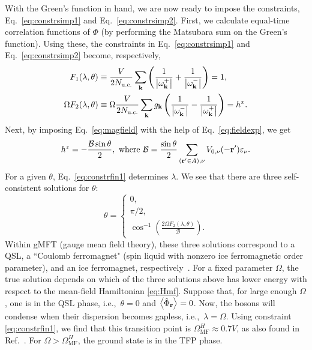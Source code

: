 \documentclass[twocolumn,superscriptaddress,amsmath,amssymb,aps,prx,nofootinbib]{revtex4-2}
\begin{document}
With the Green's function in hand, we are now ready to impose the constraints,  Eq.~\eqref{eq:constrsimp1} and Eq.~\eqref{eq:constrsimp2}. First, we calculate equal-time correlation functions of $\Phi$ (by performing the Matsubara sum on the Green's function). Using these, the constraints in Eq.~\eqref{eq:constrsimp1} and Eq.~\eqref{eq:constrsimp2}  become, respectively, 
\begin{align}
    F_1(\lambda,\theta)&\equiv \frac{V}{2N_{\text{u.c.}}}\sum_{\vb{k}}\left(\frac{1}{\abs{\omega^+_{\vb{k}}}}+ \frac{1}{\abs{\omega^-_{\vb{k}}}}\right)=1 \label{eq:constrfin1},\\
    \Omega F_2(\lambda,\theta)&\equiv \Omega \frac{V}{2N_{\text{u.c.}}}\sum_{\vb{k}}g_{\vb{k}}\left(\frac{1}{\abs{\omega^-_{\vb{k}}}}- \frac{1}{\abs{\omega^+_{\vb{k}}}}\right)=h^x.\label{eq:constrfin2}
\end{align}
Next, by imposing Eq.~\eqref{eq:magfield} with the help of Eq.~\eqref{eq:fieldexp}, we get 
\begin{equation}
    h^z=-\frac{\mathcal{B}\sin \theta}{2}, \text{ where }\mathcal{B}=\frac{\sin \theta}{2}\sum_{(\vb{r}'\in A), \nu} V_{0,\nu}(-\vb{r}')\varepsilon_\nu.
\end{equation}
For a given $\theta$, Eq.~\eqref{eq:constrfin1} determines $\lambda$. We see that there are three self-consistent solutions for $\theta$: 
\begin{equation}
\theta=
    \begin{cases}
    0,\\
    \pi/2,\\
    \cos^{-1}\left(\frac{2\Omega F_2(\lambda,\theta)}{\mathcal{B}}\right).
    \end{cases}
\end{equation}
Within gMFT (gauge mean field theory), these three solutions correspond to a QSL, a ``Coulomb ferromagnet" (spin liquid with nonzero ice ferromagnetic order parameter), and an ice ferromagnet, respectively~\cite{savary2012coulombic}. 
For a fixed parameter $\Omega$, the true solution depends on which of the three solutions above has lower energy with respect to the mean-field Hamiltonian \eqref{eq:Hmf}. Suppose that, for large enough $\Omega$, one is in the QSL phase, i.e.,~$\theta=0$ and $\expval{\hat{\Phi}_{\vb{r}}}=0$. Now, the bosons will condense when their dispersion becomes gapless, i.e.,~$\lambda=\Omega$. Using constraint \eqref{eq:constrfin1}, we find that this transition point is $\Omega^H_{\text{MF}}\approx 0.7 V$, as also found in Ref.~\cite{savary2017disorder}. For $\Omega>\Omega^H_{\text{MF}}$, the ground state is in the TFP phase.
\end{document}
